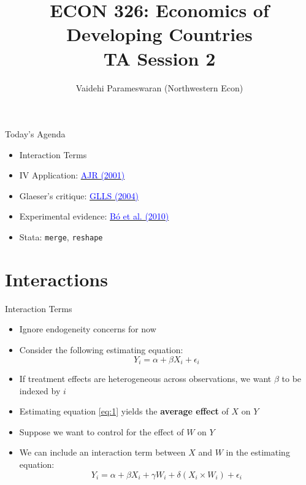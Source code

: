 \documentclass[11pt,notes=hide,aspectratio=169,mathserif]{beamer}
\title[class]{ECON 326: Economics of Developing Countries \\ TA Session 2}
\author[vaidehi's class ]{Vaidehi Parameswaran (Northwestern Econ)}
\date{\monthname[\the\month] \the\year}
\begin{document}
\begin{frame}[plain]
\titlepage
\end{frame}


\begin{frame}{Today's Agenda}
\begin{itemize}
\item Interaction Terms
\item IV Application: \href{https://pubs.aeaweb.org/doi/pdfplus/10.1257/aer.91.5.1369}{\textcolor{blue}{AJR (2001)}}
\item Glaeser's critique: \href{https://scholar.harvard.edu/files/shleifer/files/do_institutions_cause_growth.pdf}{\textcolor{blue}{GLLS (2004)}}
\item Experimental evidence: \href{https://pubs.aeaweb.org/doi/pdfplus/10.1257/aer.100.5.2205}{\textcolor{blue}{Bó et al. (2010)}}
\item Stata: \texttt{merge}, \texttt{reshape}
\end{itemize}
\end{frame}


\section*{Interactions}

\begin{frame}{Interaction Terms}
\begin{itemize}
\item Ignore endogeneity concerns for now 
\item Consider the following estimating equation:
\begin{equation}
\label{eq:1}
    Y_i = \alpha + \beta X_i + \epsilon_i
\end{equation}
\pause \item If treatment effects are heterogeneous across observations, we want $\beta$ to be indexed by $i$
\pause  \item  Estimating equation \eqref{eq:1} yields the \textbf{average effect} of $X$ on $Y$
\pause  \item  Suppose we want to control for the effect of $W$ on $Y$
\pause  \item  We can include an interaction term between $X$ and $W$ in the estimating equation:
\pause \begin{equation}
\label{eq:2}
    Y_i = \alpha + \beta X_i + \gamma W_i + \delta (X_i \times W_i) + \epsilon_i
\end{equation}
\end{itemize}
\end{frame}
\end{document}
